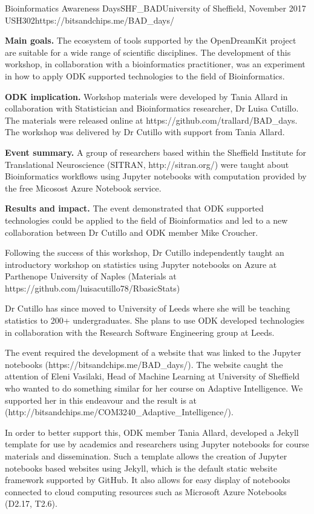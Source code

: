 \begin{event}{Bioinformatics Awareness Days}{SHF_BAD}{University of Sheffield, November 2017 }{USH}{30}{2}{https://bitsandchips.me/BAD_days/}

\textbf{Main goals.} The ecosystem of tools supported by the OpenDreamKit project are suitable for a wide range of scientific disciplines. The development of this workshop, in collaboration with a bioinformatics practitioner, was an experiment in how to apply ODK supported technologies to the field of Bioinformatics.

\textbf{ODK implication.} Workshop materials were developed by Tania Allard in collaboration with Statistician and Bioinformatics researcher, Dr Luisa Cutillo.  The materials were released online at https://github.com/trallard/BAD_days. The workshop was delivered by Dr Cutillo with support from Tania Allard.

\textbf{Event summary.} A group of researchers based within the Sheffield Institute for Translational Neuroscience (SITRAN, http://sitran.org/) were taught about Bioinformatics workflows using Jupyter notebooks with computation provided by the free Micosost Azure Notebook service.

\textbf{Results and impact.} The event demonstrated that ODK supported technologies could be applied to the field of Bioinformatics and led to a new collaboration between Dr Cutillo and ODK member Mike Croucher.

Following the success of this workshop, Dr Cutillo independently taught an introductory workshop on statistics using Jupyter notebooks on Azure at Parthenope University of Naples (Materials at https://github.com/luisacutillo78/RbasicStats)

Dr Cutillo has since moved to University of Leeds where she will be teaching statistics to 200+ undergraduates. She plans to use ODK developed technologies in collaboration with the Research Software Engineering group at Leeds.

The event required the development of a website that was linked to the Jupyter notebooks (https://bitsandchips.me/BAD_days/). The website caught the attention of Eleni Vasilaki, Head of Machine Learning at University of Sheffield who wanted to do something similar for her course on Adaptive Intelligence. We supported her in this endeavour and the result is at (http://bitsandchips.me/COM3240_Adaptive_Intelligence/).

In order to better support this, ODK member Tania Allard, developed a Jekyll template for use by academics and researchers using Jupyter notebooks for course materials and dissemination. Such a template allows the creation of Jupyter notebooks based websites using Jekyll, which is the default static website framework supported by GitHub. It also allows for easy display of notebooks connected to cloud computing resources such as Microsoft Azure Notebooks (D2.17, T2.6).


\end{event}
